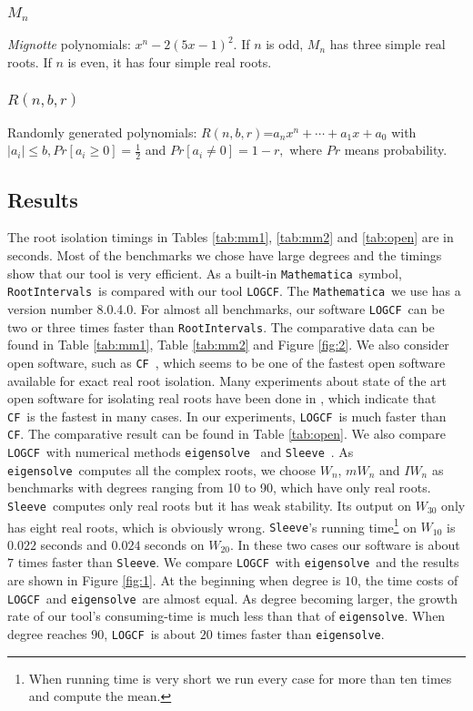 \documentclass[10pt,a4paper]{article}
\def \froot {{\tt LOGCF}}
\def \MM {{\tt Mathematica}}
\def \inte {{\tt RootIntervals}}
\def \cf {{\tt CF}}
\def \sle {{\tt Sleeve}}
\def \eign {{\tt eigensolve}}
\begin{document}
 \subsubsection{$M_n$} {\it Mignotte} polynomials: $x^n-2(5x-1)^2$. If $n$ is odd, $M_n$ has three simple real roots. If $n$ is even, it has four simple real roots.
 \subsubsection{$R(n,b,r) $} Randomly generated polynomials: $R(n,b,r)$=$a_nx^n+\cdots+a_1x+a_0$ with $|a_i|\le b, Pr[a_i\ge 0]=\frac{1}{2}$ and  $Pr[a_i\neq 0] =1-r,$ where $Pr$ means probability.
 \subsection{Results}
 The root isolation timings in Tables \ref{tab:mm1}, \ref{tab:mm2} and \ref{tab:open} are in seconds.  Most of the benchmarks we chose have large degrees and the timings show that our tool is very efficient.
As a  built-in \MM\ symbol, \inte\ is    compared with  our tool \froot. The  \MM\  we use has a version number 8.0.4.0. For  almost all
 benchmarks, our  software \froot\  can be  two or three times faster than \inte. The comparative data can be found in Table \ref{tab:mm1}, Table  \ref{tab:mm2} and Figure \ref{fig:2}.
 We also consider open software,  such as \cf\  \cite{hemmer09}, which
 seems to be one of the fastest  open software  available for exact real root isolation. Many experiments  about  state of the art open software for isolating
 real roots have been done in \cite{hemmer09},  which  indicate that     \cf\  is the fastest in many cases.
 In our experiments, \froot\ is much faster than \cf. %
 The comparative result can be found in
 Table \ref{tab:open}. We also compare \froot\  with numerical methods  \eign\ \cite{eigsolev} and \sle\ \cite{hemmer09}. As \eign\ computes all the complex roots, we choose $W_n$, $mW_n$ and $IW_n$ as benchmarks with degrees ranging from 10 to 90, which have only real roots. \sle\ computes only real roots but it has weak stability. Its output on $W_{30}$ only has eight real roots, which is obviously wrong. \sle's running time\footnote{When  running time is very short we run every case for more than ten times and compute the mean.} on $W_{10}$ is $0.022$ seconds and
 $0.024$ seconds on $W_{20}$. In these two cases our software is about $7$ times faster than \sle. We compare \froot\ with  \eign\ and the results are  shown in Figure \ref{fig:1}.
 At the beginning when degree is $10$, the time costs of \froot\ and \eign\ are
 almost equal. As degree becoming larger, the growth rate of our tool's consuming-time is much less than that of  \eign.  When degree reaches $90$, \froot\ is about $20$ times faster than \eign.
\end{document}
